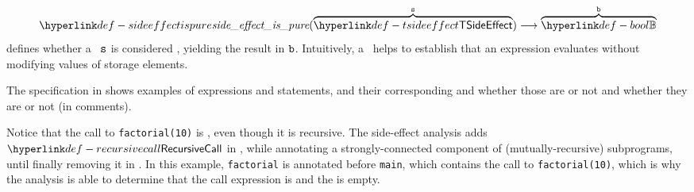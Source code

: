 \begin{mathpar}
\end{mathpar}

\begin{mathpar}
\end{mathpar}

\hypertarget{def-sideeffectispure}{}
\[
    \sideeffectispure(\overname{\TSideEffect}{\vs}) \aslto \overname{\Bool}{\vb}
\]
defines whether a \sideeffectdescriptorsterm\ $\vs$ is considered \emph{\pure},
yielding the result in $\vb$.
Intuitively, a \emph{\pure} \sideeffectdescriptorterm\ helps to establish that
an expression evaluates without modifying values of storage elements.

The specification in  shows examples of expressions
and statements, and their corresponding \sideeffectdescriptorsterm{} and whether
those are \pure{} or not and whether they are \symbolicallyevaluable{} or not (in comments).

Notice that the call to \verb|factorial(10)| is \pure, even though it is recursive.
The side-effect analysis adds $\RecursiveCall$ in ,
while annotating a strongly-connected component of (mutually-recursive) subprograms,
until finally removing it in .
In this example, \verb|factorial| is annotated before \verb|main|, which contains the
call to \verb|factorial(10)|, which is why the analysis is able to determine that the
call expression is \pure{} and the \sideeffectdescriptorsetsterm{} is empty.


